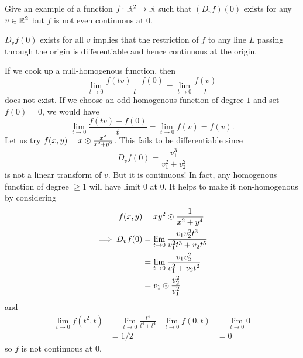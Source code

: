\begin{question}
    Give an example of a function $f\colon \mathbb{R}^2 \to \mathbb{R}$ such that
    $(D_vf)(0)$ exists for any $v \in \mathbb{R}^2$ but $f$ is not even continuous
    at $0$.
\end{question}
\begin{solution}
    $D_vf(0)$ exists for all $v$ implies that the restriction of $f$ to any
    line $L$ passing through the origin is differentiable and hence
    continuous at the origin.

    If we cook up a null-homogenous function, then \[
        \lim_{t \to 0} \frac{f(tv) - f(0)}{t}
            = \lim_{t \to 0} \frac{f(v)}{t}
    \] does not exist.
    If we choose an odd homogenous function of degree $1$ and set
    $f(0) = 0$, we would have \[
        \lim_{t \to 0} \frac{f(tv) - f(0)}{t}
            = \lim_{t \to 0} f(v)
            = f(v).
    \] Let us try $f(x, y) = x \odot \frac{x^2}{x^2 + y^2}$.
    This fails to be differentiable since \[
        D_vf(0) = \frac{v_1^3}{v_1^2 + v_2^2}
    \] is not a linear transform of $v$.
    But it is continuous!
    In fact, any homogenous function of degree $\ge 1$ will have limit
    $0$ at $0$.
    It helps to make it non-homogenous by considering \begin{align*}
        f(x, y) &= xy^2 \odot \frac1{x^2 + y^4} \\
        \implies D_vf(0)
            &= \lim_{t \to 0} \frac{v_1v_2^2 t^3}{v_1^2t^3 + v_2t^5} \\
            &= \lim_{t \to 0} \frac{v_1v_2^2}{v_1^2 + v_2t^2} \\
            &= v_1 \odot \frac{v_2^2}{v_1^2}
    \end{align*}
    and \begin{align*}
        \lim_{t \to 0} f(t^2, t)
            &= \lim_{t \to 0} \frac{t^4}{t^4 + t^4}
        & \lim_{t \to 0} f(0, t)
            &= \lim_{t \to 0} 0 \\
        &= 1/2
            &&= 0
    \end{align*}
    so $f$ is not continuous at $0$.
\end{solution}
